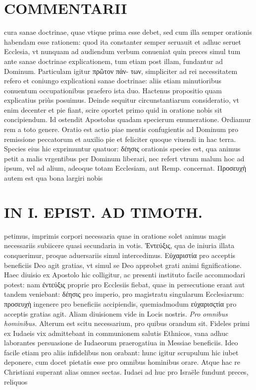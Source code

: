 \documentclass{article}
\begin{document}
\begin{pages}
\section*{COMMENTARII }
\marginpar{[ p.44 ]}\pstart cura sanae doctrinae, quae vtique prima esse debet, sed cum illa semper orationis habendam esse rationem: quod ita constanter semper seruauit et adhuc seruet Ecclesia, vt nunquam ad audiendum verbum conueniat quin preces simul tum ante sanae doctrinae explicationem, tum etiam post illam, fundantur ad Dominum. Particulam igitur πρῶτον πάν- των, simpliciter ad rei necessitatem refero et coniungo explicationi sanae doctrinae: aliis etiam minutioribus conuentum occupationibus praefero ista duo. Hactenus propositio quam explicatius priùs posuimus.  \pend\pstart Deinde sequitur circunstantiarum consideratio, vt enim decenter et pie fiant, scire oportet primo quid in oratione nobis sit concipiendum. Id ostendit Apostolus quadam specierum enumeratione. Ordiamur rem a toto genere.  \pend\pstart Oratio est actio piae mentis confugientis ad Dominum pro remissione peccatorum et auxilio pie et feliciter quoque viuendi in hac terra. Species eius hic exprimuntur quatuor: δέησις orationis species est, qua animus petit a malis vrgentibus per Dominum liberari, nec refert vtrum malum hoc ad ipsum, vel ad alium, adeoque totam Ecclesiam, aut Remp. concernat. Προσευχὴ autem est qua bona largiri nobis  \pend
\section*{IN I. EPIST. AD TIMOTH. }
\marginpar{[ p.45 ]}\pstart petimus, imprimis corpori necessaria quae in oratione solet animus magis necessariis subiicere quasi secundaria in votis.  \pend\pstart Ἐντεύξις, qua de iniuria illata conquerimur, proque aduersariis simul intercedimus. Εὐχαριστία pro acceptis beneficiis Deo agit gratias, vt simul se Deo approbet grati animi fignificatione. Haec diuisio ex Apostolo hic colligitur, ac presenti instituto facile accommodari potest: nam ἐντεύξις proprie pro Ecclesiis fiebat, quae in persecutione erant aut tandem veniebant: δέησις pro imperio, pro magistratu singularum Ecclesiarum: προσευχὴ ingenere pro beneficiis accipiendis, quemiadmodum εὐχαρισςτία pro acceptis gratias agit. Aliam diuisionem vide in Locis nostris.  \pend
\textit{Pro omnibus hominibus. }\pstart Alterum est scitu necessarium, pro quibus orandum sit. Fideles primi ex Iudaeis vix admittebant in communionem salutis Ethnicos, vana adhuc laborantes persuasione de Iudaeorum praerogatiua in Messiae beneficiis. Ideo facile etiam pro aliis infidelibus non orabant: hunc igitur scrupulum hic iubet deponere, cum docet pietatis esse pro omnibus hominibus orare. Atque hac re Christiani superant alias omnes sectas. Iudaei ad huc pro Israële fundunt preces, reliquos  \pend

\end{pages}
\end{document}
